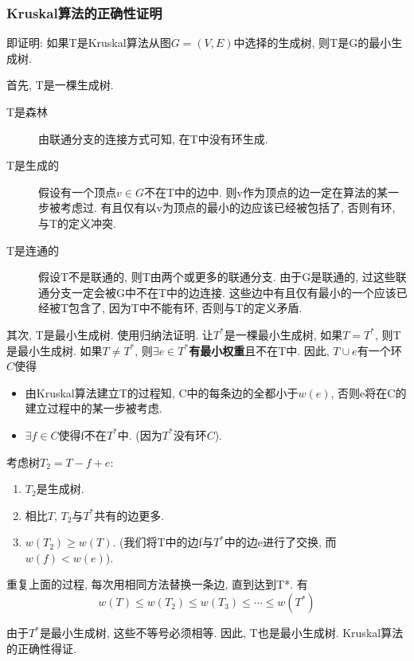 \subsubsection{Kruskal算法的正确性证明}
即证明: 如果T是Kruskal算法从图$G=(V,E)$中选择的生成树, 则T是G的最小生成树.\par
首先, T是一棵生成树.
\begin{description}
	\item[T是森林] 由联通分支的连接方式可知, 在T中没有环生成.
	\item[T是生成的] 假设有一个顶点$v \in G$不在T中的边中.
		则v作为顶点的边一定在算法的某一步被考虑过.
		有且仅有以v为顶点的最小的边应该已经被包括了, 否则有环, 与T的定义冲突.
	\item[T是连通的] 假设T不是联通的, 则T由两个或更多的联通分支. 由于G是联通的,
		过这些联通分支一定会被G中不在T中的边连接.
		这些边中有且仅有最小的一个应该已经被T包含了, 因为T中不能有环,
		否则与T的定义矛盾.
\end{description}
其次, T是最小生成树. 使用归纳法证明. 让$T^*$是一棵最小生成树, 如果$T=T^*$,
则T是最小生成树. 如果$T\neq T^*$, 则$\exists e\in
	T^*$\textbf{有最小权重}且不在T中. 因此, $T\cup e$有一个环$C$使得
\begin{itemize}
	\item 由Kruskal算法建立T的过程知, C中的每条边的全都小于$w(e)$,
	      否则e将在C的建立过程中的某一步被考虑.
	\item $\exists f\in C$使得f不在$T^*$中. (因为$T^*$没有环$C$).
\end{itemize}
考虑树$T_2=T-f+e$:
\begin{enumerate}
	\item $T_2$是生成树.
	\item 相比$T$, $T_2$与$T^*$共有的边更多.
	\item $w(T_2)\geq w(T)$. (我们将T中的边f与$T^*$中的边e进行了交换, 而$w(f) <
		      w(e)$).
\end{enumerate}

重复上面的过程, 每次用相同方法替换一条边, 直到达到T*. 有
\begin{equation}
	w(T)\leq w(T_2)\leq w(T_3)\leq \cdots \leq w(T^*)
\end{equation}

由于$T^*$是最小生成树, 这些不等号必须相等. 因此, T也是最小生成树.
Kruskal算法的正确性得证.

